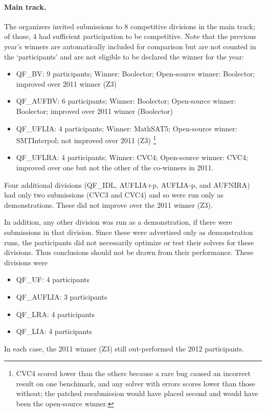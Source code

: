 \documentclass{llncs}
\begin{document}
\paragraph{Main track.} The organizers invited submissions to 8 competitive divisions in the main track; of those, 4 had sufficient participation to be competitive. Note that the previous year's winners are automatically included for comparison but are not counted in the `participants' and are not eligible to be declared the winner for the year:
\begin{itemize}
\item QF\_BV: 9 participants; Winner: Boolector; Open-source winner: Boolector; improved over 2011 winner (Z3)
\item QF\_AUFBV: 6 participants; Winner: Boolector; Open-source winner: Boolector; improved over 2011 winner (Boolector)
\item QF\_UFLIA: 4 participants; Winner: MathSAT5; Open-source winner: SMTInterpol; not improved over 2011 (Z3)
\footnote{CVC4 scored lower than the others because a rare bug caused an incorrect result on one benchmark, and any solver with errors scores lower than those without; the patched resubmission would have placed second and would have been the open-source winner.}
\item QF\_UFLRA: 4 participants; Winner: CVC4; Open-source winner: CVC4; improved over one but not the other of the co-winners in 2011.
\end{itemize}

Four additional divisions (QF\_IDL, AUFLIA+p, AUFLIA-p, and AUFNIRA) had only two submissions (CVC3 and CVC4) and so were run only as demonstrations. These did not improve over the 2011 winner (Z3).

In addition, any other division was run as a demonstration, if there were submissions in that division. Since these were advertised only as demonstration runs, the participants did not necessarily optimize or test their solvers for these divisions. Thus conclusions should not be drawn from their performance. These divisions were
\begin{itemize}
\item QF\_UF: 4 participants
\item QF\_AUFLIA: 3 participants
\item QF\_LRA: 4 participants
\item QF\_LIA: 4 participants
\end{itemize}
In each case, the 2011 winner (Z3) still out-performed the 2012 participants.
\end{document}
